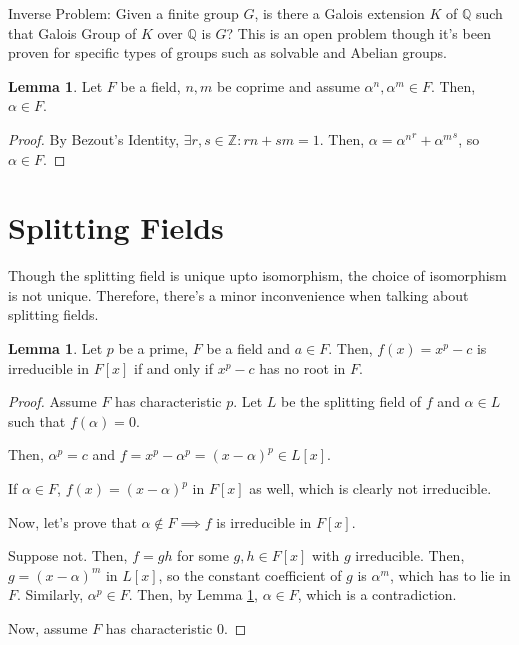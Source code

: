 \documentclass{article}
\theoremstyle{definition}
\newtheorem{lemma}[theorem]{Lemma}
\newcommand{\Z}{\mathbb{Z}}
\newcommand{\Q}{\mathbb{Q}}
\begin{document}
Inverse Problem: Given a finite group $G$, is there a Galois extension $K$ of $\Q$ such that Galois Group
of $K$ over $\Q$ is $G$? This is an open problem though it's been proven for specific types of groups such
as solvable and Abelian groups.

\begin{lemma}\label{bezout_trick}
    Let $F$ be a field, $n,m$ be coprime and assume $\alpha^{n}, \alpha^{m} \in F$.
    Then, $\alpha \in F$.
\end{lemma}
\begin{proof}
    By Bezout's Identity, $\exists r,s \in \Z: rn + sm = 1$.
    Then, $\alpha = {\alpha^{n}}^{r} + {\alpha^{m}}^{s}$, so
    $\alpha \in F$.
\end{proof}

\newpage

\section{Splitting Fields}

Though the splitting field is unique upto isomorphism, the choice of isomorphism is not unique.
Therefore, there's a minor inconvenience when talking about splitting fields.

\begin{lemma}\label{x_to_p_minus_a_irreducible_iff_no_roots}
    Let $p$ be a prime, $F$ be a field and $a \in F$.
    Then, $f(x) = x^{p} - c$ is irreducible in $F[x]$
    if and only if $x^{p} - c$ has no root in $F$.
\end{lemma}
\begin{proof}
    Assume $F$ has characteristic $p$. Let $L$ be the splitting field of $f$
    and $\alpha \in L$ such that $f(\alpha) = 0$. 
    
    Then, $\alpha^{p} = c$ and $f = x^{p} - \alpha^{p} = {(x - \alpha)}^{p} \in L[x]$.

    If $\alpha \in F$, $f(x) = {(x - \alpha)}^{p}$ in $F[x]$ as well, which is clearly not irreducible.

    Now, let's prove that $\alpha \notin F \implies f$ is irreducible in $F[x]$.

    Suppose not. Then, $f = gh$ for some $g,h \in F[x]$ with $g$ irreducible.
    Then, $g = (x - \alpha)^{m}$ in $L[x]$, so the constant coefficient of $g$
    is $\alpha^{m}$, which has to lie in $F$. Similarly, $\alpha^{p} \in F$.
    Then, by Lemma \ref{bezout_trick}, $\alpha \in F$, which is a contradiction.

    Now, assume $F$ has characteristic $0$. 
\end{proof}
\end{document}
